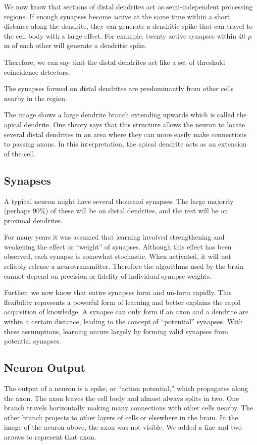 \documentclass{report}
\begin{document}
We now know that sections of distal dendrites act as semi-independent
processing regions. If enough synapses become active at the same time
within a short distance along the dendrite, they can generate a
dendritic spike that can travel to the cell body with a large
effect. For example, twenty active synapses within 40 $\mu$m of each
other will generate a dendritic spike.

Therefore, we can say that the distal dendrites act like a set of
threshold coincidence detectors.

The synapses formed on distal dendrites are predominantly from other
cells nearby in the region.

The image shows a large dendrite branch extending upwards which is
called the apical dendrite. One theory says that this structure allows
the neuron to locate several distal dendrites in an area where they
can more easily make connections to passing axons. In this
interpretation, the apical dendrite acts as an extension of the cell.

\subsection*{Synapses}
A typical neuron might have several thousand synapses. The large
majority (perhaps 90\%) of these will be on distal dendrites, and the
rest will be on proximal dendrites.

For many years it was assumed that learning involved strengthening and
weakening the effect or ``weight'' of synapses. Although this effect
has been observed, each synapse is somewhat stochastic. When
activated, it will not reliably release a neurotransmitter. Therefore
the algorithms used by the brain cannot depend on precision or
fidelity of individual synapse weights.

Further, we now know that entire synapses form and un-form
rapidly. This flexibility represents a powerful form of learning and
better explains the rapid acquisition of knowledge. A synapse can only
form if an axon and a dendrite are within a certain distance, leading
to the concept of ``potential'' synapses. With these assumptions,
learning occurs largely by forming valid synapses from potential
synapses.

\subsection*{Neuron Output}
The output of a neuron is a spike, or ``action potential,'' which
propagates along the axon. The axon leaves the cell body and almost
always splits in two. One branch travels horizontally making many
connections with other cells nearby. The other branch projects to
other layers of cells or elsewhere in the brain. In the image of the
neuron above, the axon was not visible. We added a line and two arrows
to represent that axon.
\end{document}
